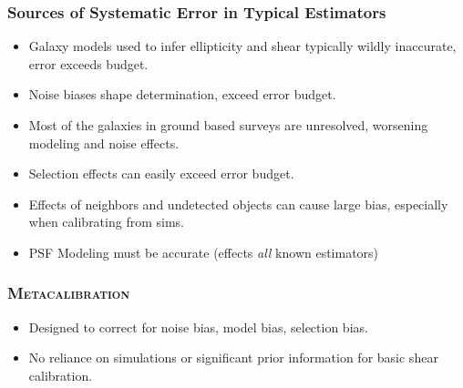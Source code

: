 \documentclass{beamer}
\newcommand{\Mcal}{\textsc{Metacalibration}}
\begin{document}
\frame
{
    \frametitle{Sources of Systematic Error in Typical Estimators}

 
    \begin{itemize}

        \item Galaxy models used to infer ellipticity and shear 
            typically wildly inaccurate, error exceeds budget.

        \item Noise biases shape determination, exceed error budget.

        \item Most of the galaxies in ground based surveys are
            unresolved, worsening modeling and noise effects.

        \item Selection effects can easily exceed error budget.

        \item Effects of neighbors and undetected objects can cause
            large bias, especially when calibrating from sims.

        \item PSF Modeling must be accurate (effects {\em all} known estimators)

    \end{itemize}

}


\frame
{
    \frametitle{\Mcal}

 
 \begin{itemize}
     \item Designed to correct for noise bias, model bias, selection bias.
     \item No reliance on simulations or significant prior information
         for basic shear calibration.
 \end{itemize}

}
\end{document}

